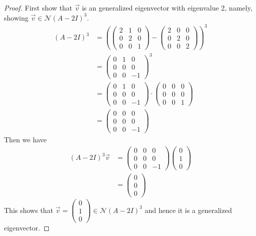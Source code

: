 \documentclass{article}
\begin{document}
\begin{proof}
First show that $\vec{v}$ is an generalized eigenvector with eigenvalue 2, namely, showing $\vec{v} \in \mathcal{N}(A-2I)^3$.
\begin{align*}
(A-2I)^3 &= (\begin{pmatrix} 2& 1 & 0 \\ 0&2&0 \\ 0&0&1 \end{pmatrix} - \begin{pmatrix} 2&0&0 \\ 0&2&0 \\ 0&0&2 \end{pmatrix} )^3\\
&= \begin{pmatrix} 0&1&0 \\0&0&0\\0&0&-1 \end{pmatrix}^3 \\
&= \begin{pmatrix} 0&1&0 \\0&0&0\\0&0&-1 \end{pmatrix} \cdot  \begin{pmatrix} 0&0&0 \\0&0&0\\0&0&1 \end{pmatrix} \\
&=  \begin{pmatrix} 0&0&0 \\0&0&0\\0&0&-1 \end{pmatrix}
\end{align*}
Then we have
\begin{align*}
(A-2I)^3 \vec{v} &=  \begin{pmatrix} 0&0&0 \\0&0&0\\0&0&-1 \end{pmatrix} \begin{pmatrix} 0\\1\\0 \end{pmatrix} \\
&= \begin{pmatrix}0\\0\\0 \end{pmatrix}
\end{align*}
This shows that $\vec{v} = \begin{pmatrix} 0\\1\\0 \end{pmatrix} \in \mathcal{N}(A-2I)^3$ and hence it is a generalized eigenvector.


\end{proof}
\end{document}
